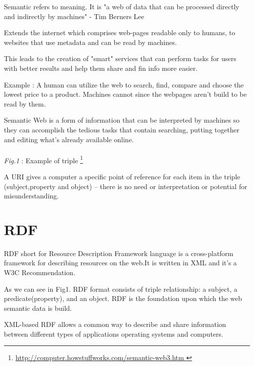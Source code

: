 \documentclass[a4paper,11pt]{report}
\begin{document}
Semantic refers to  {\color{red}meaning}. It is "a web of data that can be processed directly and indirectly by machines" - Tim Berners Lee

Extends the internet which comprises web-pages readable only to humans, to websites that use metadata and can be read by machines.

This leads to the creation of "smart" services that can perform tasks for users with better results and help them share and fin info more easier.

Example : A human can utilize the web to search, find, compare and choose the lowest price to a product. Machines cannot since the webpages aren't build to be read by them.

Semantic Web is a form of information that can be interpreted by machines so they can accomplish the tedious tasks that contain searching, putting together and editing what's already available online.

\paragraph{}

\begin{center}
\textit{Fig.1} : Example of triple \footnote{\url {http://computer.howstuffworks.com/semantic-web3.htm
}}
\end{center}
 A URI gives a computer a specific point of reference for each item in the triple (subject,property and object) -- there is no need or interpretation or potential for misunderstanding.

\section{RDF}
\paragraph{}
RDF short for Resource Description Framework language is a  {\color{red}cross-platform framework} for describing resources on the web.It is written in XML and it's a W3C Recommendation.

As we can see in Fig1. RDF format consists of triple relationship: a subject, a predicate(property), and an object. RDF is the foundation upon which the web semantic data is build.

XML-based RDF allows a common way to describe and share information between different types of applications operating systems and computers.
 
\end{document}
